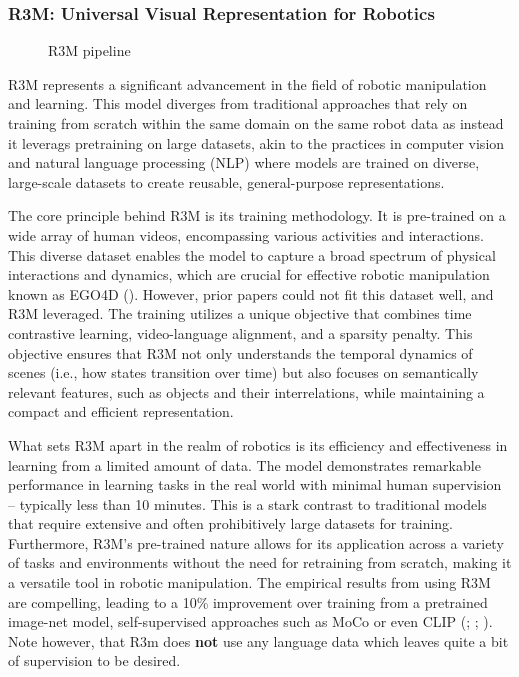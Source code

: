 \documentclass[
  letterpaper,
  numbers=noenddot,
  DIV=11]{scrreprt}
\theoremstyle{definition}
\theoremstyle{plain}
\theoremstyle{plain}
\theoremstyle{remark}
\begin{document}
\subsubsection*{R3M: Universal Visual Representation for
Robotics}\label{r3m-universal-visual-representation-for-robotics}

\begin{figure}


\caption{\label{fig-r3m-pipline}R3M pipeline}

\end{figure}%

R3M represents a significant advancement in the field of robotic
manipulation and learning. This model diverges from traditional
approaches that rely on training from scratch within the same domain on
the same robot data as instead it leverags pretraining on large
datasets, akin to the practices in computer vision and natural language
processing (NLP) where models are trained on diverse, large-scale
datasets to create reusable, general-purpose representations.

The core principle behind R3M is its training methodology. It is
pre-trained on a wide array of human videos, encompassing various
activities and interactions. This diverse dataset enables the model to
capture a broad spectrum of physical interactions and dynamics, which
are crucial for effective robotic manipulation known as EGO4D
(). However, prior
papers could not fit this dataset well, and R3M leveraged. The training
utilizes a unique objective that combines time contrastive learning,
video-language alignment, and a sparsity penalty. This objective ensures
that R3M not only understands the temporal dynamics of scenes (i.e., how
states transition over time) but also focuses on semantically relevant
features, such as objects and their interrelations, while maintaining a
compact and efficient representation.

What sets R3M apart in the realm of robotics is its efficiency and
effectiveness in learning from a limited amount of data. The model
demonstrates remarkable performance in learning tasks in the real world
with minimal human supervision -- typically less than 10 minutes. This
is a stark contrast to traditional models that require extensive and
often prohibitively large datasets for training. Furthermore, R3M's
pre-trained nature allows for its application across a variety of tasks
and environments without the need for retraining from scratch, making it
a versatile tool in robotic manipulation. The empirical results from
using R3M are compelling, leading to a 10\% improvement over training
from a pretrained image-net model, self-supervised approaches such as
MoCo or even CLIP (;
;
). Note however,
that R3m does \textbf{not} use any language data which leaves quite a
bit of supervision to be desired.
\end{document}
